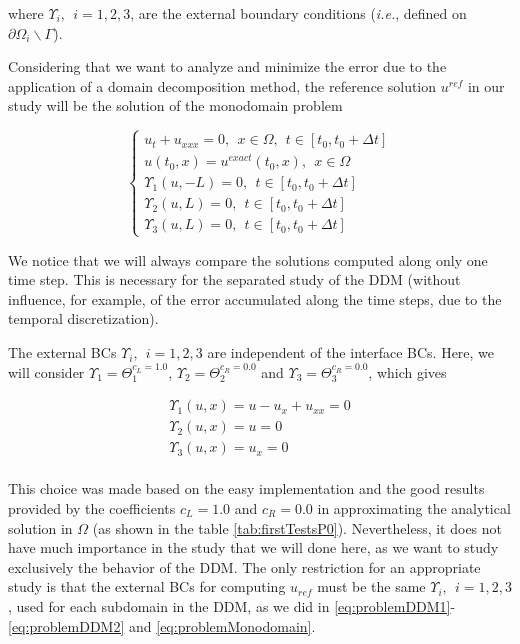 \noindent where $ \Upsilon_i, \ \ i=1,2,3$, are the external boundary conditions (\emph{i.e.}, defined on $\partial \Omega_i \backslash \Gamma$).

\indent Considering that we want to analyze and minimize the error due to the application of a domain decomposition method, the reference solution $u^{ref}$ in our study will be the solution of the monodomain problem

\begin{equation}
	\label{eq:problemMonodomain}
	\begin{cases}
	u_t + u_{xxx} = 0, \ \ x \in \Omega, \ \ t \in [t_0, t_0+\Delta t] \\
	u(t_0,x) = u^{exact}(t_0,x) , \ \ x \in \Omega \\ 
	\Upsilon_1(u,-L) = 0, \ \ t \in [t_0, t_0+\Delta t] \\
	\Upsilon_2(u,L) = 0, \ \ t \in [t_0, t_0+\Delta t] \\
	\Upsilon_3(u,L) = 0, \ \ t \in [t_0, t_0+\Delta t]
	\end{cases}
\end{equation}
	
\indent We notice that we will always compare the solutions computed along only one time step. This is necessary for the separated study of the DDM (without influence, for example, of the error accumulated along the time steps, due to the temporal discretization).

\indent The external BCs $ \Upsilon_i, \ \ i=1,2,3$ are independent of the interface BCs. Here, we will consider $\Upsilon_1 = \Theta_1^{c_L = 1.0}$, $\Upsilon_2 = \Theta_2^{c_R = 0.0}$ and $\Upsilon_3 = \Theta_3^{c_R = 0.0}$, which gives

\begin{equation*}
	\begin{gathered}
	\Upsilon_1(u,x) = u - u_x + u_{xx} = 0\\
	\Upsilon_2(u,x) = u = 0\\
	\Upsilon_3(u,x) = u_x = 0\\
	\end{gathered}
\end{equation*}

\indent This choice was made based on the easy implementation and the good results provided by the coefficients $c_L = 1.0$ and $c_R = 0.0$ in approximating the analytical solution in $\Omega$ (as shown in the table \ref{tab:firstTestsP0}). Nevertheless, it does not have much importance in the study that we will done here, as we want to study exclusively the behavior of the DDM. The only restriction for an appropriate study is that the external BCs for computing $u_{ref}$ must be the same $\Upsilon_i, \ \ i=1,2,3$, used for each subdomain in the DDM, as we did in \eqref{eq:problemDDM1}-\eqref{eq:problemDDM2} and \eqref{eq:problemMonodomain}.

